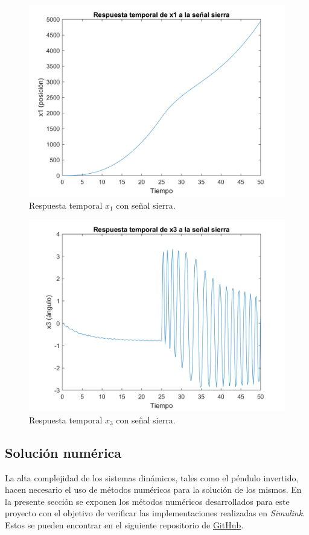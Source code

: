 \documentclass[journal]{IEEEtran}
\begin{document}
\begin{figure}[ht!]
\caption{Respuesta temporal $x_1$ con señal sierra.\label{x1sierra}}
  \centering
\includegraphics[scale=0.18]{figures/x1sierra.png}
\end{figure}

\begin{figure}[ht!]
\caption{Respuesta temporal $x_3$ con señal sierra.\label{x3sierra}}
  \centering
\includegraphics[scale=0.18]{figures/x3sierra.png}
\end{figure}


\subsection{Solución numérica}
La alta complejidad de los sistemas dinámicos, tales como el péndulo invertido, hacen necesario el uso de métodos numéricos para la solución de los mismos. En la presente sección se exponen los métodos numéricos desarrollados para este proyecto con el objetivo de verificar las implementaciones realizadas en \textit{Simulink}. Estos se pueden encontrar en el siguiente repositorio de \href{https://github.com/anpoc/Inverted-pendulum}{GitHub}.\\
\end{document}
